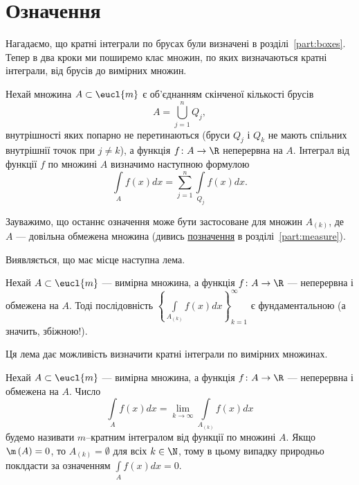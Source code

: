 \section{Означення}
Нагадаємо, що кратні інтеграли по брусах були визначені в розділі~\ref{part:boxes}. Тепер в два кроки ми поширемо клас множин, по яких визначаються кратні інтеграли, від брусів до вимірних множин.
\begin{definition}
Нехай множина ${A\subset\eucl{m}}$ є об'єднанням скінченої кількості брусів
\[
A = \bigcup\limits_{j=1}^nQ_j,
\]
внутрішності яких попарно не перетинаються  (бруси ${Q_j}$ і ${Q_k }$ не мають спільних внутрішнії точок при ${j\neq k}$), а функція ${f\colon A\to \R}$ неперервна на $A$. Інтеграл від функції $f$ по множині $A$ визначимо наступною формулою
\[
\int\limits_Af(x) d x = \sum\limits_{j=1}^n\int\limits_{Q_j}f(x) d x.
\]
\end{definition}
\begin{remark}
Зауважимо, що останнє означення може бути застосоване для множин ${A_{(k)}}$, де $A$ --- довільна обмежена множина (дивись \hyperref[partition_sets]{позначення} в розділі~\ref{part:measure}).
\end{remark}
Виявляється, що має місце наступна лема.
\begin{lemma}
Нехай ${A\subset\eucl{m}}$ --- вимірна множина, а функція ${f\colon A\to\R}$ --- неперервна і обмежена на ${A}$. Тоді послідовність ${\left\{\int\limits_{A_{(k)}}f(x) d x\right\}_{k=1}^\infty}$ є фундаментальною (а значить, збіжною!).
\end{lemma}
Ця лема дає можливість визначити кратні інтеграли по вимірних множинах.
\begin{definition}
Нехай ${A\subset\eucl{m}}$ --- вимірна множина, а функція ${f\colon A\to\R}$ --- неперервна і обмежена на ${A}$. Число
\[
\int\limits_{A}f(x) d x = \lim\limits_{k\to\infty}\int\limits_{A_{(k)}}f(x) d x
\]
будемо називати ${m}$--кратним інтегралом від функції  по множині ${A}$. Якщо ${\m\left(A\right) = 0}$, то ${A_{(k)} = \emptyset}$ для всіх ${k\in\N}$, тому в цьому випадку природньо поклдасти за означенням ${\int\limits_{A}f(x) d x = 0}$.
\end{definition}

